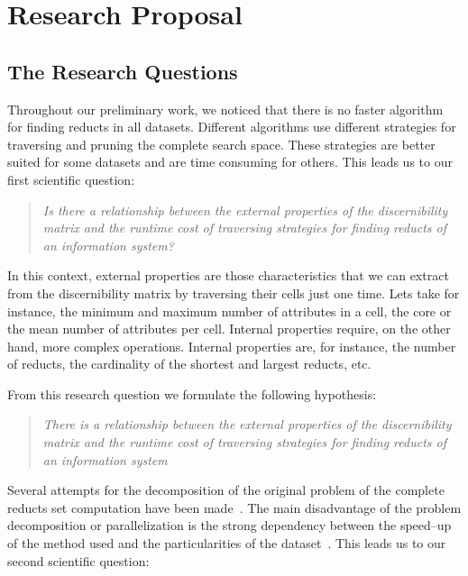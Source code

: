 \documentclass[authoryear,11pt]{elsarticle}
\begin{document}
\section{Research Proposal}\label{ResearchProposal} 
\subsection{The Research Questions}\label{ResearchQuestions} 
  Throughout our preliminary work, we noticed that there is no faster algorithm for finding reducts in 
  all datasets. Different algorithms use different strategies for traversing and pruning the complete search 
  space. These strategies are better suited for some datasets and are time consuming for others. This leads 
  us to our first scientific question:
  
\begin{quote}
  \emph{Is there a relationship between the external properties of the discernibility matrix and the runtime 
  		cost of traversing strategies for finding reducts of an information system?}
\end{quote}
  		
  In this context, external properties are those characteristics that we can extract from the discernibility
  matrix by traversing their cells just one time. Lets take for instance, the minimum and maximum number of
  attributes in a cell, the core or the mean number of attributes per cell. Internal properties require, on 
  the other hand, more complex operations. Internal properties are, for instance, the number of reducts, the
  cardinality of the shortest and largest reducts, etc.
  
  From this research question we formulate the following hypothesis:
  
\begin{quote}  
  \emph{There is a relationship between the external properties of the discernibility matrix and the runtime 
  		cost of traversing strategies for finding reducts of an information system}
\end{quote}
  		
  Several attempts for the decomposition of the original problem of the complete reducts set computation have 
  been made~\citep{Strakowski08,Jiao10,Kopczynski14}. The main disadvantage of the problem decomposition or
  parallelization is the strong dependency between the speed--up of the method used and the particularities of 
  the dataset~\citep{Strakowski08}. This leads us to our second scientific question:
  
\end{document}
